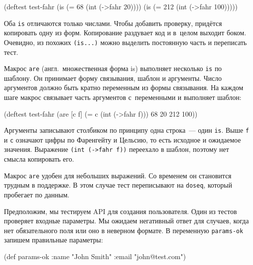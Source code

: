 \begin{english}
  \begin{clojure}
(deftest test-fahr
  (is (= 68 (int (->fahr 20))))
  (is (= 212 (int (->fahr 100)))))
  \end{clojure}
\end{english}

Оба \verb|is| отличаются только числами. Чтобы добавить проверку, придётся
копировать одну из форм. Копирование раздувает код и в~целом выходит
боком. Очевидно, из похожих \verb|(is...)| можно выделить постоянную часть и
переписать тест.


Макрос \verb|are| (англ.~множественная форма is) выполняет несколько
\verb|is| по шаблону. Он принимает форму связывания, шаблон и аргументы. Число
аргументов должно быть кратно переменным из формы связывания. На каждом шаге
макрос связывает часть аргументов с~переменными и выполняет шаблон:

\begin{english}
  \begin{clojure}
(deftest test-fahr
  (are [c f] (= c (int (->fahr f)))
    68 20
    212 100))
  \end{clojure}
\end{english}

Аргументы записывают столбиком по принципу одна строка~--- один
\verb|is|. Выше \verb|f| и \verb|c| означают цифры по Фаренгейту и
Цельсию, то есть исходное и ожидаемое значения. Выражение \verb|(int (->fahr f))|
переехало в шаблон, поэтому нет смысла копировать его.

Макрос \verb|are| удобен для небольших выражений. Со временем он становится
трудным в поддержке. В этом случае тест переписывают на \verb|doseq|, который
пробегает по данным.

Предположим, мы тестируем API для создания пользователя. Один из тестов
проверяет входные параметры. Мы ожидаем негативный ответ для случаев, когда нет
обязательного поля или оно в неверном формате. В переменную \verb|params-ok|
запишем правильные параметры:

\ifx\devicetype\mobile

\begin{english}
  \begin{clojure}
(def params-ok {:name "John Smith"
                :email "john@test.com"})
  \end{clojure}
\end{english}

